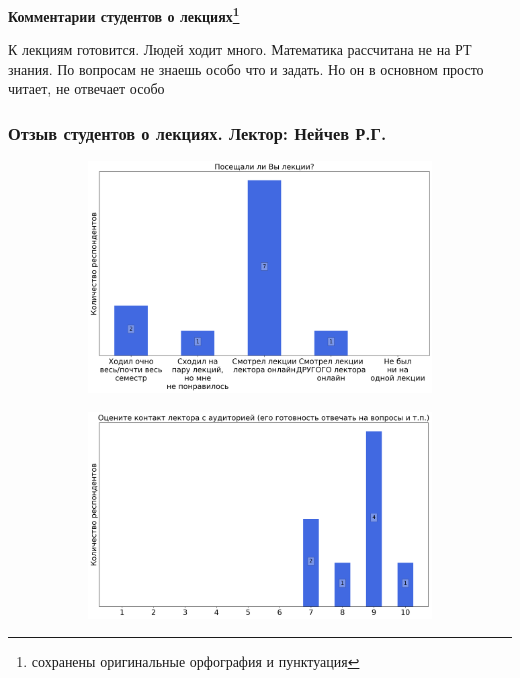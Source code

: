 		\textbf{Комментарии студентов о лекциях\protect\footnote{сохранены оригинальные орфография и пунктуация}} 
            \begin{commentbox} 
                К лекциям готовится. Людей ходит много. Математика рассчитана не на РТ знания. 
                По вопросам не знаешь особо что и задать. Но он в основном просто читает, не отвечает особо 
            \end{commentbox}


    \subsubsection{Отзыв студентов о лекциях. Лектор: Нейчев Р.Г.}
		\begin{figure}[H]
			\centering
            \begin{subfigure}[b]{0.45\textwidth}
				\centering
				\includegraphics[width=\textwidth]{images/4 course/Введение в машинное обучение/lecturer-questions-Нейчев Р.Г.-0.png}
			\end{subfigure}
			\begin{subfigure}[b]{0.45\textwidth}
				\centering
				\includegraphics[width=\textwidth]{images/4 course/Введение в машинное обучение/lecturer-marks-Нейчев Р.Г.-0.png}

\end{subfigure}
\end{figure}
